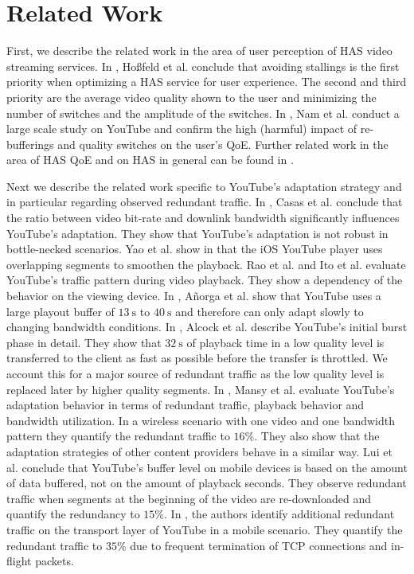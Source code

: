 
\section{Related Work}
\label{sec:relatedwork}

First, we describe the related work in the area of user perception of HAS video streaming services.
In \cite{hossfeld2015identifying, hossfeld14assessingeffect}, Hoßfeld et al. conclude that avoiding stallings is the first priority when optimizing a HAS service for user experience. 
The second and third priority are the average video quality shown to the user and minimizing the number of switches and the amplitude of the switches.
In \cite{nam16qoe}, Nam et al. conduct a large scale study on YouTube and confirm the high (harmful) impact of re-bufferings and quality switches on the user's QoE.
Further related work in the area of HAS QoE and on HAS in general can be found in \cite{seufert2015survey}.

Next we describe the related work specific to YouTube's adaptation strategy and in particular regarding observed redundant traffic.
In \cite{casas2012youtube}, Casas et al. conclude that the ratio between video bit-rate and downlink bandwidth significantly influences YouTube's adaptation.
They show that YouTube's adaptation is not robust in bottle-necked scenarios.
Yao et al. show in \cite{Yao2014b} that the iOS YouTube player uses overlapping segments to smoothen the playback.
Rao et al. \cite{rao2011network} and Ito et al. \cite{ito14networklevel} evaluate YouTube's traffic pattern during video playback. They show a dependency of the behavior on the viewing device.
In \cite{Anorga2015}, A\~norga et al. show that YouTube uses a large playout buffer of $\SI{13}{\second}$ to $\SI{40}{\second}$ and therefore can only adapt slowly to changing bandwidth conditions.
In \cite{alcock11application}, Alcock et al. describe YouTube's initial burst phase in detail. They show that $\SI{32}{\second}$ of playback time in a low quality level is transferred to the client as fast as possible before the transfer is throttled. We account this for a major source of redundant traffic as the low quality level is replaced later by higher quality segments.
In \cite{Mansy2014}, Mansy et al. evaluate YouTube's adaptation behavior in terms of redundant traffic, playback behavior and bandwidth utilization. In a wireless scenario with one video and one bandwidth pattern they quantify the redundant traffic to $16\%$. They also show that the adaptation strategies of other content providers behave in a similar way.
Lui et al. \cite{liu2013comparative} conclude that YouTube's buffer level on mobile devices is based on the amount of data buffered, not on the amount of playback seconds. They observe redundant traffic when segments at the beginning of the video are re-downloaded and quantify the redundancy to $15\%$.
In \cite{nam2013mobile}, the authors identify additional redundant traffic on the transport layer of YouTube in a mobile scenario. They quantify the redundant traffic to $35\%$ due to frequent termination of TCP connections and in-flight packets.
